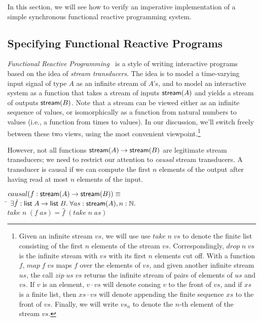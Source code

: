 In this section, we will see how to verify an imperative
implementation of a simple synchronous functional reactive programming
system.

\subsection{Specifying Functional Reactive Programs}

\emph{Functional Reactive Programming}~\cite{frp} is a style of
writing interactive programs based on the idea of \emph{stream
  transducers}.  The idea is to model a time-varying input signal of
type $A$ as an infinite stream of $A$'s, and to model an interactive
system as a function that takes a stream of inputs $\mathsf{stream}({A})$ and
yields a stream of outputs $\mathsf{stream}({B})$. Note that a stream can be
viewed either as an infinite sequence of values, or isomorphically as
a function from natural numbers to values (i.e., a function from times
to values). In our discussion, we'll switch freely between these two
views, using the most convenient viewpoint.\footnote{Given an infinite stream $vs$, we will use use $take\;n\;vs$ to denote
the finite list consisting of the first $n$ elements of the stream
$vs$. Correspondingly, $drop\;n\;vs$ is the infinite stream with $vs$
with its first $n$ elements cut off. With a function $f$, $map\;f\;vs$
maps $f$ over the elements of $vs$, and given another infinite stream
$us$, the call $zip\;us\;vs$ returns the infinite stream of pairs of
elements of $us$ and $vs$. If $v$ is an element, $v \cdot vs$ will 
denote consing $v$ to the front of $vs$, and if $xs$ is a finite list, then
$xs \cdot vs$ will denote appending the finite sequence $xs$ to the
front of $vs$. Finally, we will write $vs_n$ to denote the $n$-th element
of the stream $vs$.}

However, not all functions $\mathsf{stream}({A}) \to \mathsf{stream}({B})$ are legitimate
stream transducers; we need to restrict our attention to \emph{causal}
stream transducers. A transducer is causal if we can compute the first
$n$ elements of the output after having read at most $n$ elements of
the input. 

\begin{tabbing}
$causal(f : \mathsf{stream}({A}) \to \mathsf{stream}({B})) \equiv$ \\
\;\;\= $\exists \hat{f} : \mathsf{list}\;{A} \to \mathsf{list}\;{B}.\;\forall as:\mathsf{stream}({A}), n:\mathbb{N}.$ \\
    \> \;\;$take\;n\;(f\;as) = \hat{f}\;(take\;n\;as)$ 
\end{tabbing}

